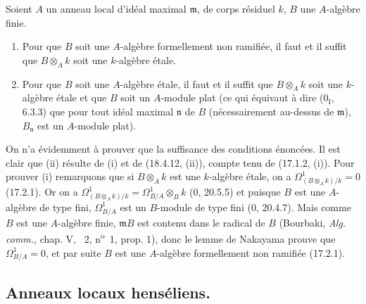 \begin{corollary}[18.4.14]
\label{IV.18.4.14}
Soient $A$ un anneau local d'idéal maximal $\mathfrak m$, de corps résiduel $k$, $B$ une $A$-algèbre finie.


\begin{enumerate}
  \item[(i)] Pour que $B$ soit une $A$-algèbre formellement non ramifiée, il faut et il suffit que $B\otimes_A k$ soit une $k$-algèbre étale.
  \item[(ii)] Pour que $B$ soit une $A$-algèbre étale, il faut et il suffit que $B\otimes_A k$ soit une $k$-algèbre étale et que $B$ soit un $A$-module plat (ce qui équivaut à dire ($0_{\mathrm I}$, 6.3.3) que pour tout idéal maximal $\mathfrak n$ de $B$ (nécessairement au-dessus de $\mathfrak m$), $B_{\mathfrak n}$ est un $A$-module plat).
\end{enumerate}
\end{corollary}

On n'a évidemment à prouver que la suffisance des conditions énoncées. Il est clair que (ii) résulte de (i) et de (18.4.12, (ii)), compte tenu de (17.1.2, (i)). Pour prouver (i) remarquons que si $B\otimes_A k$ est une $k$-algèbre étale, on a $\Omega^1_{(B\otimes_A k)/k}=0$ (17.2.1). Or on a $\Omega^1_{(B\otimes_A k)/k}=\Omega^1_{B/A}\otimes_B k$ (0, 20.5.5) et puisque $B$ est une $A$-algèbre de type fini, $\Omega^1_{B/A}$ est un $B$-module de type fini (0, 20.4.7). Mais comme $B$ est une $A$-algèbre finie, $\mathfrak mB$ est contenu dans le radical de $B$ (Bourbaki, \emph{Alg. comm.}, chap. V, \textsection~2, n\textsuperscript{o}~1, prop. 1), donc le lemme de Nakayama prouve que $\Omega^1_{B/A}=0$, et par suite $B$ est une $A$-algèbre formellement non ramifiée (17.2.1).

\subsection{Anneaux locaux henséliens\texorpdfstring{\protect\footnotemark}{}.}


